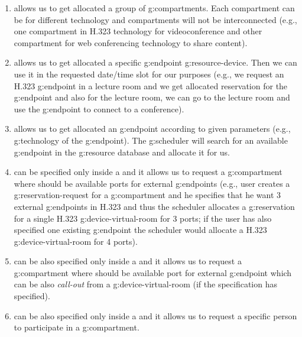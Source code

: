 \begin{enumerate}
\item {} allows us to get allocated a group of \gls{g:compartment}s. Each compartment can be for different technology and compartments will not be interconnected (e.g., one compartment in H.323 technology for videoconference and other compartment for web conferencing technology to share content).

\item {} allows us to get allocated a specific \gls{g:endpoint} \gls{g:resource-device}. Then we can use it in the requested date/time slot for our purposes (e.g., we request an H.323 \gls{g:endpoint} in a lecture room and we get allocated reservation for the \gls{g:endpoint} and also for the lecture room, we can go to the lecture room and use the \gls{g:endpoint} to connect to a conference).

\item {} allows us to get allocated an \gls{g:endpoint} according to given parameters (e.g., \gls{g:technology} of the \gls{g:endpoint}). The \gls{g:scheduler} will search for an available \gls{g:endpoint} in the \gls{g:resource} database and allocate it for us.

\item {} can be specified only inside a  and it allows us to request a \gls{g:compartment} where should be available ports for external \glspl{g:endpoint} (e.g., user creates a \gls{g:reservation-request} for a \gls{g:compartment} and he specifies that he want 3 external \glspl{g:endpoint} in H.323 and thus the scheduler allocates a \gls{g:reservation} for a single H.323 \gls{g:device-virtual-room} for 3 ports; if the user has also specified one existing \gls{g:endpoint} the scheduler would allocate a H.323 \gls{g:device-virtual-room} for 4 ports).

\item {} can be also specified only inside a  and it allows us to request a \gls{g:compartment} where should be available port for external \gls{g:endpoint} which can be also \emph{call-out} from a \gls{g:device-virtual-room} (if the specification has  specified).

\item {} can be also specified only inside a  and it allows us to request a specific person to participate in a \gls{g:compartment}.

\end{enumerate}

